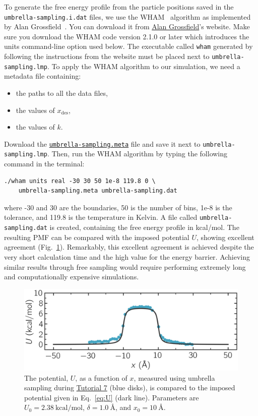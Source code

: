 \documentclass[9pt,tutorial]{livecoms}
\newcommand{\lmpcmd}[1]{\colorbox{listing}{\textcolor{command}{\small{#1}}}} %
\newcommand{\flecmd}[1]{\textcolor{command}{\texttt{#1}}} %
\newcommand{\dwlcmd}[1]{\textcolor{download}{\texttt{#1}}} %
\newcommand{\filepath}{https://raw.githubusercontent.com/lammpstutorials/lammpstutorials-article/main/files/}
\begin{document}
To generate the free energy profile from the particle positions saved in
the \flecmd{umbrella-sampling.i.dat} files, we use the
WHAM~\cite{kumar1992weighted,kumar1995multidim} algorithm as implemented
by Alan Grossfield~\cite{grossfieldimplementation}.  You can download it
from \href{http://membrane.urmc.rochester.edu/?page_id=126}{Alan
  Grossfield}'s website.  Make sure you download the WHAM code version
2.1.0 or later which introduces the \lmpcmd{units} command-line option
used below. The executable called \flecmd{wham} generated by following
the instructions from the website must be placed next to
\flecmd{umbrella-sampling.lmp}.  To apply the WHAM algorithm to our
simulation, we need a metadata file containing:
\begin{itemize}
\item the paths to all the data files,
\item the values of $x_\text{des}$,
\item the values of $k$.
\end{itemize}
Download the
\href{\filepath tutorial7/umbrella-sampling.meta}{\dwlcmd{umbrella-sampling.meta}}
file and save it next to \flecmd{umbrella-sampling.lmp}.  Then, run the
WHAM algorithm by typing the following command in the terminal:
\begin{lstlisting}
./wham units real -30 30 50 1e-8 119.8 0 \
    umbrella-sampling.meta umbrella-sampling.dat
\end{lstlisting}
where -30 and 30 are the boundaries, 50 is the number of bins, 1e-8 is the tolerance,
and 119.8 is the temperature in Kelvin.  A file called \flecmd{umbrella-sampling.dat} is created,
containing the free energy profile in kcal/mol.  The resulting PMF can be compared
with the imposed potential $U$, showing excellent agreement
(Fig.~\ref{fig:US-freenergy}).  Remarkably, this excellent agreement is achieved despite
the very short calculation time and the high value for the energy barrier.
Achieving similar results through free sampling would require performing extremely
long and computationally expensive simulations.

\begin{figure}
\centering
\includegraphics[width=\linewidth]{US-free-energy}
\caption{The potential, $U$, as a function of $x$, measured using umbrella
sampling during \hyperref[umbrella-sampling-label]{Tutorial 7} (blue disks),
is compared to the imposed potential given in Eq.~\eqref{eq:U}
(dark line).  Parameters are $U_0 = 2.38~\text{kcal/mol}$, $\delta = 1.0~\text{\AA{}}$,
and $x_0 = 10~\text{\AA{}}$.}
\label{fig:US-freenergy}
\end{figure}
\end{document}
